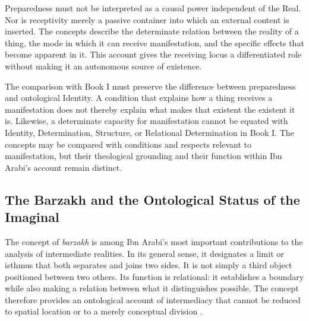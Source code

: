 \label{para:VS.B01.P01.C08.SS09.P002}

Preparedness must not be interpreted as a causal
power independent of the Real. Nor is receptivity
merely a passive container into which an external
content is inserted. The concepts describe the
determinate relation between the reality of a thing,
the mode in which it can receive manifestation,
and the specific effects that become apparent in
it. This account gives the receiving locus a
differentiated role without making it an autonomous
source of existence.

\label{para:VS.B01.P01.C08.S16.SS09.P003}

The comparison with Book I must preserve the
difference between preparedness and ontological
Identity. A condition that explains how a thing
receives a manifestation does not thereby explain
what makes that existent the existent it is.
Likewise, a determinate capacity for manifestation
cannot be equated with Identity, Determination,
Structure, or Relational Determination in Book I.
The concepts may be compared with conditions and
respects relevant to manifestation, but their
theological grounding and their function within
Ibn Arabi's account remain distinct.



\subsection{The Barzakh and the Ontological Status of the Imaginal}
\label{subsec:ch08_s16_ss10}

\label{para:VS.B01.P01.C08.SS10.P001}

The concept of \textit{barzakh} is among Ibn Arabi's
most important contributions to the analysis of
intermediate realities. In its general sense, it
designates a limit or isthmus that both separates
and joins two sides. It is not simply a third object
positioned between two others. Its function is
relational: it establishes a boundary while also
making a relation between what it distinguishes
possible. The concept therefore provides an
ontological account of intermediacy that cannot
be reduced to spatial location or to a merely
conceptual division \citep{BashierIbnArabiBarzakh2004}.

